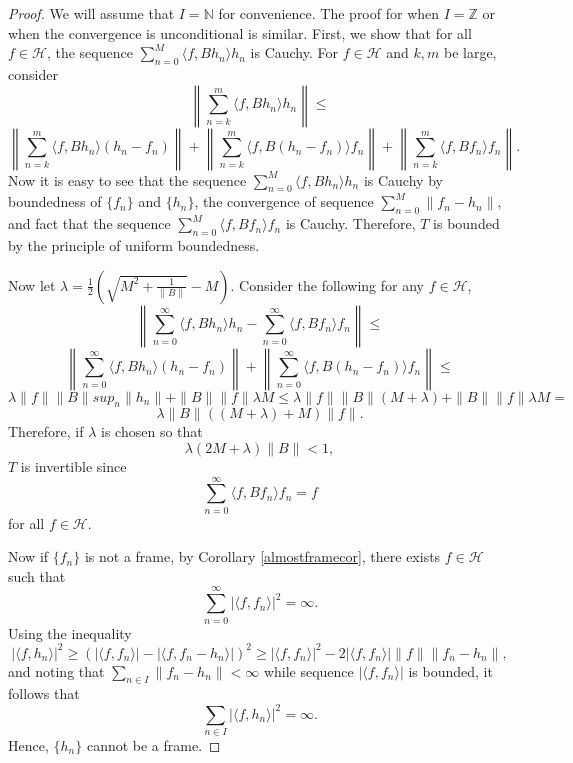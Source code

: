 \documentclass[10pt,a4paper]{amsart}
\newcommand{\Hcal}{\mathcal{H}} %
\begin{document}
\begin{proof}
We will assume that $I=\mathbb{N}$ for convenience. The proof for when $I=\mathbb{Z}$ or when the convergence is unconditional is similar.
First, we show that for all $f\in \Hcal$, the sequence $\sum_{n=0}^{M}\langle f, Bh_{n}\rangle h_{n}$ is Cauchy.
For $f\in \Hcal$ and $k,m$ be large, consider
$$\left \|\sum_{n=k}^{m}\langle f, Bh_n\rangle h_n \right\| \leq$$
$$\left \|\sum_{n=k}^{m}\langle f, Bh_n\rangle (h_n-f_n) \right\|+\left\|\sum_{n=k}^{m}\langle f, B(h_n-f_n)\rangle f_n \right\|+ \left \|\sum_{n=k}^{m}\langle f, Bf_n\rangle f_n \right\|.$$
Now it is easy to see that the sequence $\sum_{n=0}^{M}\langle f, Bh_{n}\rangle h_{n}$ is Cauchy by boundedness of $\{f_n\}$ and $\{h_{n}\}$, the convergence of sequence $\sum_{n=0}^{M}\|f_{n}-h_{n}\|$, and fact that the sequence $\sum_{n=0}^{M}\langle f, Bf_{n}\rangle f_{n}$ is Cauchy. Therefore, $T$ is bounded by the principle of uniform boundedness.

Now let $\lambda=\frac{1}{2}\left(\sqrt{M^2 + \frac{1}{\|B\|}} - M \right)$. Consider the following for any $f\in \Hcal$,
$$\left\|\sum_{n=0}^{\infty}\langle f, Bh_{n}\rangle h_{n}-\sum_{n=0}^{\infty}\langle f, Bf_{n}\rangle f_{n} \right \| \leq$$
$$\left \|\sum_{n=0}^{\infty}\langle f, Bh_n\rangle (h_n-f_n)\right \|+ \left\|\sum_{n=0}^{\infty}\langle f, B(h_n-f_n)\rangle f_n\right\| \leq$$ $$\lambda \|f\| \|B\| sup_{n}\|h_n\|+ \|B\| \|f\| \lambda M \leq \lambda \|f\| \|B\| (M+\lambda)+\|B\| \|f\| \lambda M=$$
$$\lambda \|B\|((M+\lambda)+M)\|f\|.$$
Therefore, if $\lambda$ is chosen so that $$\lambda(2M+\lambda)\|B\|<1, $$ $T$ is invertible since 
$$\sum_{n=0}^{\infty}\langle f, Bf_{n}\rangle f_{n}=f$$ for all $f\in \Hcal$.

Now if \(\{f_n\}\) is not a frame, by Corollary \ref{almostframecor}, there exists \(f \in \mathcal{H}\) such that
\[
\sum_{n=0}^\infty |\langle f, f_n \rangle|^2 = \infty.
\]
Using the inequality
$$
|\langle f, h_n \rangle|^2 \geq (|\langle f,f_n\rangle|-|\langle f,f_n-h_n\rangle|)^{2}
\geq  |\langle f, f_n \rangle|^2 - 2|\langle f, f_n \rangle|\|f\| \|f_n-h_n\| ,
$$
and noting that \(\sum_{n\in I} \|f_n - h_n\| < \infty\) while sequence \(|\langle f, f_n \rangle|\) is bounded, it follows that
\[
\sum_{n\in I} |\langle f, h_n \rangle|^2 = \infty.
\]
Hence, \(\{h_n\}\) cannot be a frame.
\end{proof}
\end{document}
